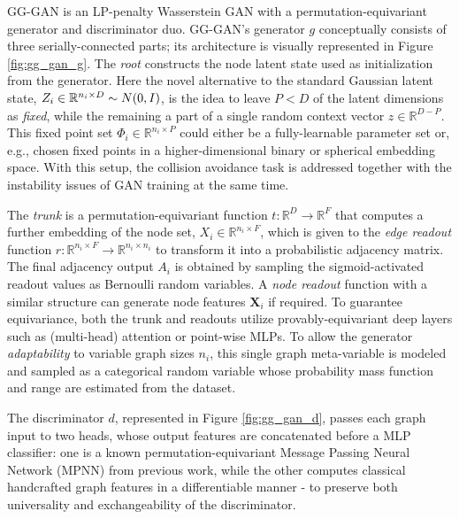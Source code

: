 GG-GAN \cite{krawczuk_gg-gan_2020} is an LP-penalty Wasserstein GAN \cite{gulrajani_improved_2017} with a permutation-equivariant generator and discriminator duo. GG-GAN's generator $g$ conceptually consists of three serially-connected parts; its architecture is visually represented in Figure \ref{fig:gg_gan_g}. The \emph{root} constructs the node latent state used as initialization from the generator. Here the novel alternative to the standard Gaussian latent state, $Z_i \in \mathbb{R}^{n_i \times D} \sim N\mathopen{}\left(0,I\right)$, is the idea to leave $P<D$ of the latent dimensions as \emph{fixed}, while the remaining a part of a single random context vector $z \in \mathbb{R}^{D-P}$. This fixed point set $\Phi_i \in \mathbb{R}^{n_i \times P}$ could either be a fully-learnable parameter set or, e.g., chosen fixed points in a higher-dimensional binary or spherical embedding space. With this setup, the collision avoidance task is addressed together with the instability issues of GAN training at the same time. 

The \emph{trunk} is a permutation-equivariant function $t: \mathbb{R}^D \to \mathbb{R}^{F}$ that computes a further embedding of the node set, $X_i \in \mathbb{R}^{n_i \times F}$, which is given to the \emph{edge readout} function $r: \mathbb{R}^{n_i \times F} \to \mathbb{R}^{n_i \times n_i}$ to transform it into a probabilistic adjacency matrix. The final adjacency output $A_i$ is obtained by sampling the sigmoid-activated readout values as Bernoulli random variables. A \emph{node readout} function with a similar structure can generate node features $\mathbf{X}_i$ if required. To guarantee equivariance, both the trunk and readouts utilize provably-equivariant deep layers such as (multi-head) attention or point-wise MLPs. To allow the generator \emph{adaptability} to variable graph sizes $n_i$, this single graph meta-variable is modeled and sampled as a categorical random variable whose probability mass function and range are estimated from the dataset.

The discriminator $d$, represented in Figure \ref{fig:gg_gan_d}, passes each graph input to two heads, whose output features are concatenated before a MLP classifier: one is a known permutation-equivariant Message Passing Neural Network (MPNN) from previous work, while the other computes classical handcrafted graph features in a differentiable manner - to preserve both universality and exchangeability of the discriminator.

